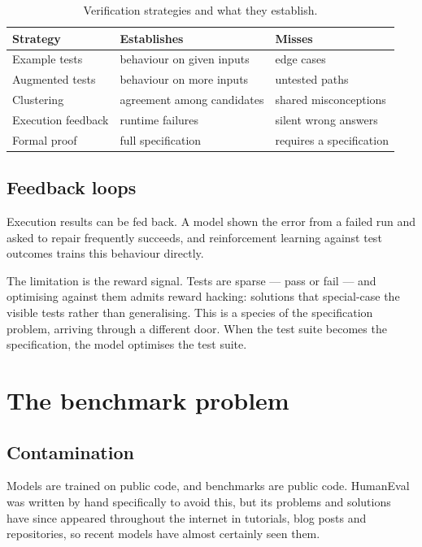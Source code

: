 \documentclass[11pt,a4paper]{article}
\begin{document}
\begin{table}[htbp]
  \centering
  \caption{Verification strategies and what they establish.}
  \label{tab:verification}
  \begin{tabular}{lll}
    \toprule
    \textbf{Strategy} & \textbf{Establishes} & \textbf{Misses} \\
    \midrule
    Example tests \cite{chen2021}   & behaviour on given inputs & edge cases \\
    Augmented tests \cite{liu2023}  & behaviour on more inputs  & untested paths \\
    Clustering \cite{li2022}        & agreement among candidates & shared misconceptions \\
    Execution feedback \cite{le2022} & runtime failures         & silent wrong answers \\
    Formal proof \cite{solar2008}   & full specification        & requires a specification \\
    \bottomrule
  \end{tabular}
\end{table}

\subsection{Feedback loops}

Execution results can be fed back. A model shown the error from a failed run
and asked to repair frequently succeeds, and reinforcement learning against
test outcomes \cite{le2022} trains this behaviour directly.

The limitation is the reward signal. Tests are sparse --- pass or fail --- and
optimising against them admits reward hacking: solutions that special-case the
visible tests rather than generalising. This is a species of the specification
problem, arriving through a different door. When the test suite becomes the
specification, the model optimises the test suite.

\section{The benchmark problem}
\label{sec:benchmarks}

\subsection{Contamination}

Models are trained on public code, and benchmarks are public code. HumanEval
was written by hand specifically to avoid this, but its problems and solutions
have since appeared throughout the internet in tutorials, blog posts and
repositories, so recent models have almost certainly seen them.
\end{document}

